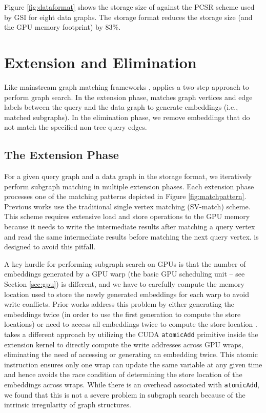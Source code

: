 Figure \ref{fig:dataformat} shows the storage size of \SystemName against the PCSR scheme used by GSI for eight data graphs. The \SystemName storage
format reduces the storage size (and the GPU memory footprint) by 83\%.

\section{Extension and Elimination\label{sec:extensionphase}}
Like mainstream graph matching frameworks \cite{tran2015fast, zeng2020gsi}, \SystemName applies a two-step approach to perform graph
search. In the extension phase, \SystemName matches graph vertices and edge labels between the query and the data graph to generate embeddings (i.e., matched subgraphs). In the elimination phase, we remove embeddings that do not match the specified non-tree query edges.


\subsection{The Extension Phase}

For a given query graph and a data graph in the \SystemName storage format, we iteratively perform subgraph matching in multiple extension
phases. Each extension phase processes one of the matching patterns depicted in Figure \ref {fig:matchpattern}. Previous works
\cite{zeng2020gsi,sun2020subgraph} use the traditional single vertex matching (SV-match) scheme. This scheme requires extensive load and
store operations to the GPU memory because it needs to write the intermediate results after matching a query vertex and read the same
intermediate results before matching the next query vertex. \SystemName is designed to avoid this pitfall.


A key hurdle for performing subgraph search on GPUs is that the number of embeddings generated by a GPU warp (the basic
GPU scheduling unit – see Section \ref {sec:gpu}) is different, and we have to carefully compute the memory location
used to store the newly generated embeddings for each warp to avoid write conflicts. Prior works address this problem
by either generating the embeddings twice (in order to use the first generation to compute the store locations)
\cite{tran2015fast} or need to access all embeddings twice to compute the store location \cite{zeng2020gsi}.
\SystemName takes a different approach by utilizing the CUDA \texttt{atomicAdd} primitive inside the extension kernel
to directly compute the write addresses across GPU wraps, eliminating the need of accessing or generating an embedding
twice. This atomic instruction ensures only one wrap can update the same variable at any given time and hence avoids
the race condition of determining the store location of the embeddings across wraps. While there is an overhead
associated with \texttt{atomicAdd}, we found that this is not a severe problem in subgraph search because of the
intrinsic irregularity of graph structures.


